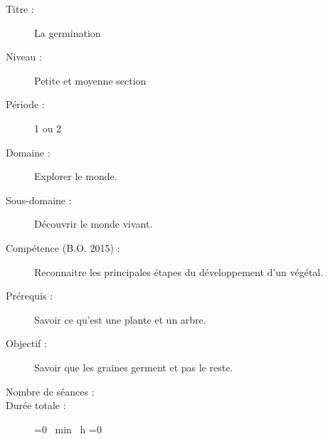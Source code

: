 \begin{description}
\item[Titre :] La germination
\item[Niveau :] Petite et moyenne section
\item[Période :] 1 ou 2
\item[Domaine :] Explorer le monde.
\item[Sous-domaine :] Découvrir le monde vivant.
\item[Compétence\footnotemark{} (B.O. 2015)	 :] Reconnaitre les principales étapes du développement d'un végétal.
\item[Prérequis :] Savoir ce qu’est une plante et un arbre.
\item[Objectif :] Savoir que les graines germent et pas le reste.
\item[Nombre de séances :] \theNbSeance
\item[Durée totale :] 
\ifnum\value{DureeTotaleHeure}=0 %
\theDureeTotaleMinutes{}~min
\else\theDureeTotaleHeure{}~h 
	\ifnum\value{DureeTotaleMinutes}=0 %
	\else\theDureeTotaleMinutes
	\fi
\fi
\end{description}